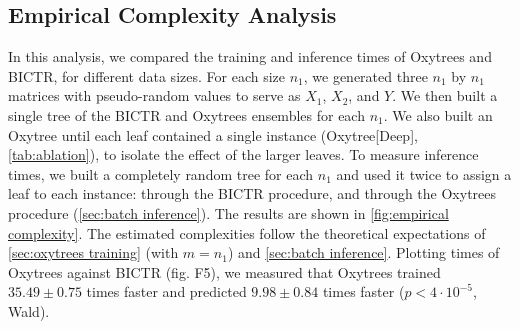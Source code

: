 \documentclass[letterpaper]{article}
\begin{document}
\subsection{Empirical Complexity Analysis}
\label{sec:empirical complexity}

In this analysis, we compared the training and inference times of Oxytrees and BICTR, for different data sizes.
For each size $n_1$, we generated three $n_1$ by $n_1$ matrices with pseudo-random values to serve as $X_1$, $X_2$, and $Y$. We then built a single tree of the BICTR and Oxytrees ensembles for each $n_1$.
We also built an Oxytree until each leaf contained a single instance (Oxytree[Deep], \cref{tab:ablation}), to isolate the effect of the larger leaves.
To measure inference times, we built a completely random tree for each $n_1$ and used it twice to assign a leaf to each instance: through the BICTR procedure, and through the Oxytrees procedure (\cref{sec:batch inference}).
The results are shown in \cref{fig:empirical complexity}. The estimated complexities follow the theoretical expectations of \cref{sec:oxytrees training} (with $m = n_1$) and \cref{sec:batch inference}.
Plotting times of Oxytrees against BICTR
(fig. F5),
we measured that Oxytrees trained $35.49 \pm 0.75$ times faster
and predicted $9.98 \pm 0.84$ times faster ($p < 4 \cdot 10^{-5}$, Wald).

\end{document}
